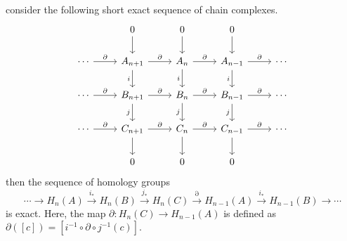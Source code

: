 \begin{thm} consider the following short exact sequence of chain complexes.
\begin{equation}
\begin{tikzcd}
&0\arrow{d}&0\arrow{d}&0\arrow{d}&\\
\cdots\arrow{r}{\partial}&A_{n+1}\arrow{r}{\partial}\arrow[swap]{d}{i}&A_n\arrow{r}{\partial}\arrow[swap]{d}{i}&A_{n-1}\arrow{r}{\partial}\arrow[swap]{d}{i}&\cdots\\
\cdots\arrow{r}{\partial}&B_{n+1}\arrow{r}{\partial}\arrow[swap]{d}{j}&B_{n}\arrow{r}{\partial}\arrow[swap]{d}{j}&B_{n-1}\arrow{r}{\partial}\arrow[swap]{d}{j}&\cdots\\
\cdots\arrow{r}{\partial}&C_{n+1}\arrow{r}{\partial}\arrow[swap]{d}&C_{n}\arrow{r}{\partial}\arrow[swap]{d}&C_{n-1}\arrow{r}{\partial}\arrow[swap]{d}&\cdots\\
&0&0&0&
\end{tikzcd}
\end{equation}
then the sequence of homology groups
\begin{equation}
\cdots\rightarrow H_n(A)\xrightarrow{i_*} H_n(B)\xrightarrow {j_*} H_n(C)\xrightarrow{\partial} H_{n-1}(A)\xrightarrow{i_*}H_{n-1}(B)\rightarrow\cdots
\end{equation}
is exact. Here, the map $\partial : H_n(C)\rightarrow H_{n-1}(A)$ is defined as $\partial([c])=[i^{-1}\circ \partial \circ j^{-1}(c)]$.
\end{thm}
